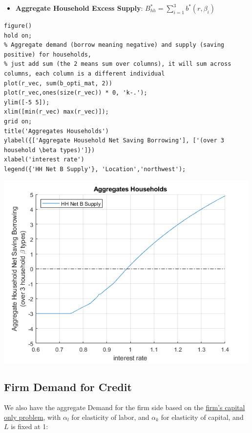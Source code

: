 \documentclass[
]{book}
\providecommand{\tightlist}{%
  \setlength{\itemsep}{0pt}\setlength{\parskip}{0pt}}
\begin{document}
\begin{itemize}
\tightlist
\item
  \textbf{Aggregate Household Excess Supply}:
  \(B_{hh}^* =\sum_{i=1}^3 b^* (r,\beta_i )\)
\end{itemize}

\begin{verbatim}
figure()
hold on;
% Aggregate demand (borrow meaning negative) and supply (saving positive) for households,
% just add sum (the 2 means sum over columns), it will sum across columns, each column is a different individual
plot(r_vec, sum(b_opti_mat, 2))
plot(r_vec,ones(size(r_vec)) * 0, 'k-.');
ylim([-5 5]);
xlim([min(r_vec) max(r_vec)]);
grid on;
title('Aggregates Households')
ylabel({['Aggregate Household Net Saving Borrowing'], ['(over 3 household \beta types)']})
xlabel('interest rate')
legend({'HH Net B Supply'}, 'Location','northwest');
\end{verbatim}

\includegraphics[width=5.20833in,height=\textheight]{img/equilibrium_constrainedborrow_images/figure_1.png}

\hypertarget{firm-demand-for-credit}{%
\subsection{Firm Demand for Credit}\label{firm-demand-for-credit}}

We also have the aggregate Demand for the firm side based on the \href{https://math4econ.github.io/matrix_application/KL_borrowhire_firm.html}{firm's
capital only
problem},
with \(\alpha_l\) for elasticity of labor, and \(\alpha_k\) for elasticity
of capital, and \(L\) is fixed at 1:
\end{document}
